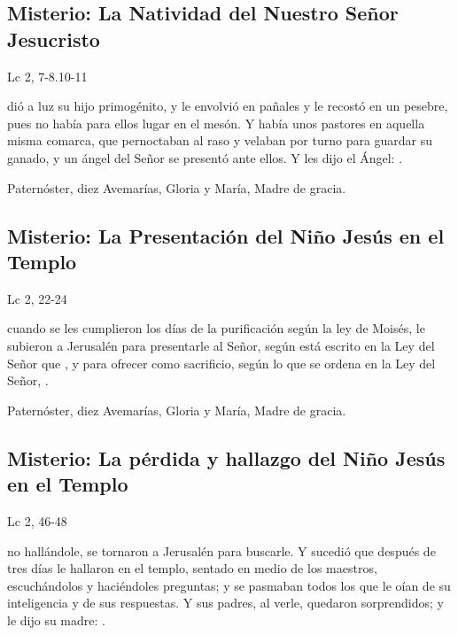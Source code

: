 \documentclass[10pt,a4paper,oneside]{book}
\newcounter{joyful-counter}
\begin{document}
\subsection*{ Misterio: La Natividad del Nuestro Señor Jesucristo}
\begin{flushright}
      {\color{red}Lc 2, 7-8.10-11}
\end{flushright}
 dió a luz su hijo primogénito, y le envolvió en pañales y le recostó en un pesebre, pues no había para ellos lugar en el mesón. 
Y había unos pastores en aquella misma comarca, que pernoctaban al raso y velaban por turno para guardar su ganado, y un ángel del Señor se presentó ante ellos. 
Y les dijo el Ángel: .

\begin{center}
      Paternóster, diez Avemarías, Gloria y María, Madre de gracia.
\end{center}

\subsection*{ Misterio: La Presentación del Niño Jesús en el Templo}
\begin{flushright}
      {\color{red}Lc 2, 22-24}
\end{flushright}
 cuando se les cumplieron los días de la purificación según la ley de Moisés, le subieron a Jerusalén para presentarle al Señor, 
según está escrito en la Ley del Señor que , y para ofrecer como sacrificio, 
según lo que se ordena en la Ley del Señor, .

\begin{center}
      Paternóster, diez Avemarías, Gloria y María, Madre de gracia.
\end{center}

\subsection*{ Misterio: La pérdida y hallazgo del Niño Jesús en el Templo}
\begin{flushright}
      {\color{red}Lc 2, 46-48}
\end{flushright}
 no hallándole, se tornaron a Jerusalén para buscarle. Y sucedió que después de tres días le hallaron en el templo, 
sentado en medio de los maestros, escuchándolos y haciéndoles preguntas; y se pasmaban todos los que le oían de su inteligencia y de sus respuestas. 
Y sus padres, al verle, quedaron sorprendidos; y le dijo su madre: .
\end{document}
